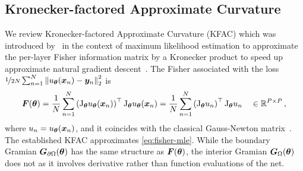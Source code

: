 \subsection{Kronecker-factored Approximate Curvature}\label{sec:kfac-background}

We review Kronecker-factored Approximate Curvature (KFAC) which was introduced by~\citet{heskes2000natural, martens2015optimizing} in the context of maximum likelihood estimation to approximate the per-layer Fisher information matrix by a Kronecker product to speed up approximate natural gradient descent~\cite{amari1998natural}.
The Fisher associated with the loss $\nicefrac{1}{2N} \sum_{n=1}^N \left\lVert u_{\bm{\theta}}({\bm{x}}_n) - {\bm{y}}_n \right\rVert_2^2$ is
\begin{equation}\label{eq:fisher-mle}
  {\bm{F}}({\bm{\theta}})
  =
  \frac{1}{N}
  \sum_{n=1}^N
  \left(\mathrm{J}_{{\bm{\theta}}} u_{{\bm{\theta}}}({\bm{x}}_n)  \right)^\top
  \mathrm{J}_{{\bm{\theta}}} u_{{\bm{\theta}}}({\bm{x}}_n)
  =
  \frac{1}{N}
  \sum_{n=1}^N
  \left( \mathrm{J}_{{\bm{\theta}}} u_n \right)^\top
  \mathrm{J}_{{\bm{\theta}}} u_n
  \quad\in {\mathbb{R}}^{P\times P}\,,
\end{equation}
where $u_n = u_{\bm{\theta}}({\bm{x}}_n)$, and it coincides with the classical Gauss-Newton matrix~\citep{martens2020new}.
The established KFAC approximates \eqref{eq:fisher-mle}.
While the boundary Gramian ${\bm{G}}_{\partial\Omega}({\bm{\theta}})$ has the same structure as ${\bm{F}}({\bm{\theta}})$, the interior Gramian ${\bm{G}}_\Omega({\bm{\theta}})$ does not as it involves derivative rather than function evaluations of the net.

